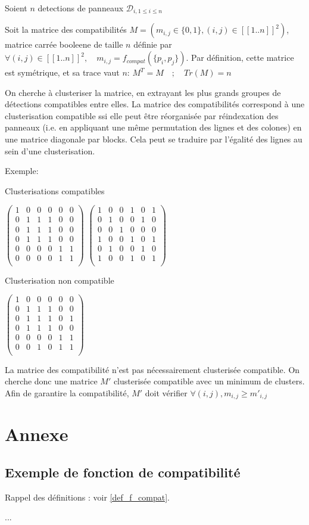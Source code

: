 \documentclass{article}
\begin{document}
Soient \(n\) detections de panneaux \(\mathscr{D}_{i, 1\leq i\leq n}\)

Soit la matrice des compatibilités \(M = (m_{i,j} \in \{0, 1\}, (i, j) \in [\![1..n]\!]^{2})\), matrice carrée booleene de taille \(n\) définie par \(\forall (i, j) \in [\![1..n]\!]^{2}, \quad m_{i,j} = f_{compat}(\{p_{i}, p_{j}\})\). Par définition, cette matrice est symétrique, et sa trace vaut \(n\): \(M^{T} = M \quad ; \quad Tr(M) = n\)

On cherche à clusteriser la matrice, en extrayant les plus grands groupes de détections compatibles entre elles.
La matrice des compatibilités correspond à une clusterisation compatible ssi elle peut être réorganisée par réindexation des panneaux (i.e. en appliquant une même permutation des lignes et des colones) en une matrice diagonale par blocks. Cela peut se traduire par l'égalité des lignes au sein d'une clusterisation.

Exemple:

Clusterisations compatibles

\(\begin{pmatrix}
	1&0&0&0&0&0	\\
	0&1&1&1&0&0	\\
	0&1&1&1&0&0	\\
	0&1&1&1&0&0	\\
	0&0&0&0&1&1	\\
	0&0&0&0&1&1	\\
\end{pmatrix}\)
\(\begin{pmatrix}
	1&0&0&1&0&1	\\
	0&1&0&0&1&0	\\
	0&0&1&0&0&0	\\
	1&0&0&1&0&1	\\
	0&1&0&0&1&0	\\
	1&0&0&1&0&1	\\
\end{pmatrix}\)

Clusterisation non compatible

\(\begin{pmatrix}
	1&0&0&0&0&0	\\
	0&1&1&1&0&0	\\
	0&1&1&1&0&1	\\
	0&1&1&1&0&0	\\
	0&0&0&0&1&1	\\
	0&0&1&0&1&1	\\
\end{pmatrix}\)

La matrice des compatibilité n'est pas nécessairement clusterisée compatible. On cherche donc une matrice \(M'\) clusterisée compatible avec un minimum de clusters. Afin de garantire la compatibilité, \(M'\) doit vérifier \(\forall (i,j), m_{i,j} \geq m'_{i,j}\)

\section{Annexe}

\subsection{Exemple de fonction de compatibilité}

\label{ex_f_compat}
Rappel des définitions : voir \ref{def_f_compat}.

...
\end{document}
